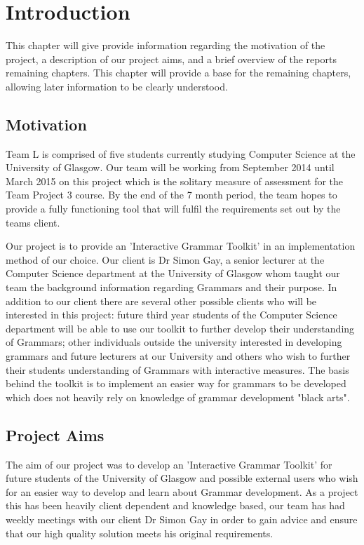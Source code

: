 \chapter{Introduction}
This chapter will give provide information regarding the motivation of the project, a description of our project aims, and a brief overview of the reports remaining chapters. This chapter will provide a base for the remaining chapters, allowing later information to be clearly understood.

\label{intro}

\section{Motivation}
Team L is comprised of five students currently studying Computer Science at the University of Glasgow. Our team will be working from September 2014 until March 2015 on this project which is the solitary measure of assessment for the Team Project 3 course. By the end of the 7 month period, the team hopes to provide a fully functioning tool that will fulfil the requirements set out by the teams client. 

Our project is to provide an 'Interactive Grammar Toolkit' in an implementation method of our choice. Our client is Dr Simon Gay, a senior lecturer at the Computer Science department at the University of Glasgow whom taught our team the background information regarding Grammars and their purpose. In addition to our client there are several other possible clients who will be interested in this project: future third year students of the Computer Science department will be able to use our toolkit to further develop their understanding of Grammars; other individuals outside the university interested in developing grammars and future lecturers at our University and others who wish to further their students understanding of Grammars with interactive measures.  The basis behind the toolkit is to implement an easier way for grammars to be developed which does not heavily rely on knowledge of grammar development "black arts".

\section{Project Aims}
The aim of our project was to develop an 'Interactive Grammar Toolkit' for future students of the University of Glasgow and possible external users who wish for an easier way to develop and learn about Grammar development. As a project this has been heavily client dependent and knowledge based, our team has had weekly meetings with our client Dr Simon Gay in order to gain advice and ensure that our high quality solution meets his original requirements. 


